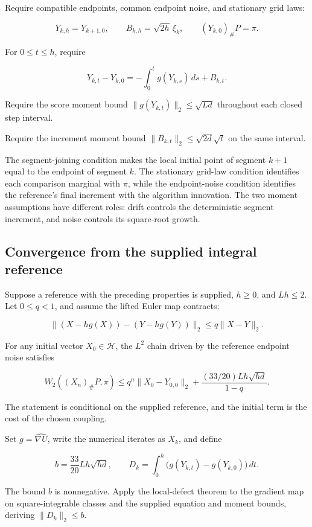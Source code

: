 \documentclass[11pt,a4paper]{article}
\begin{document}
Require compatible endpoints, common endpoint noise, and stationary grid laws:

\[Y_{k,h}=Y_{k+1,0},\qquad B_{k,h}=\sqrt{2h}\,\xi_k,\qquad(Y_{k,0})_\#P=\pi.\]

For \(0\le t\le h\), require

\[Y_{k,t}-Y_{k,0}=-\int_0^t g(Y_{k,s})\,ds+B_{k,t}.\]

Require the score moment bound \(\|g(Y_{k,t})\|_2\le\sqrt{Ld}\) throughout each closed step interval.



Require the increment moment bound \(\|B_{k,t}\|_2\le\sqrt{2d}\sqrt t\) on the same interval.



The segment-joining condition makes the local initial point of segment \(k+1\) equal to the endpoint of segment \(k\). The stationary grid-law condition identifies each comparison marginal with \(\pi\), while the endpoint-noise condition identifies the reference's final increment with the algorithm innovation. The two moment assumptions have different roles: drift controls the deterministic segment increment, and noise controls its square-root growth.


\subsection{\texorpdfstring{Convergence from the supplied integral reference}{Convergence from the supplied integral reference}}


Suppose a reference with the preceding properties is supplied, \(h\ge0\), and \(Lh\le2\). Let \(0\le q<1\), and assume the lifted Euler map contracts:

\[\|(X-hg(X))-(Y-hg(Y))\|_2\le q\|X-Y\|_2.\]

For any initial vector \(X_0\in\mathcal H\), the \(L^2\) chain driven by the reference endpoint noise satisfies

\[W_2((X_n)_\#P,\pi)\le q^n\|X_0-Y_{0,0}\|_2+\frac{(33/20)Lh\sqrt{hd}}{1-q}.\]

The statement is conditional on the supplied reference, and the initial term is the cost of the chosen coupling.



Set \(g=\widehat{\nabla U}\), write the numerical iterates as \(X_k\), and define

\[b=\frac{33}{20}Lh\sqrt{hd},\qquad D_k=\int_0^h\bigl(g(Y_{k,t})-g(Y_{k,0})\bigr)\,dt.\]

The bound \(b\) is nonnegative. Apply the local-defect theorem to the gradient map on square-integrable classes and the supplied equation and moment bounds, deriving \(\|D_k\|_2\le b\).
\end{document}
